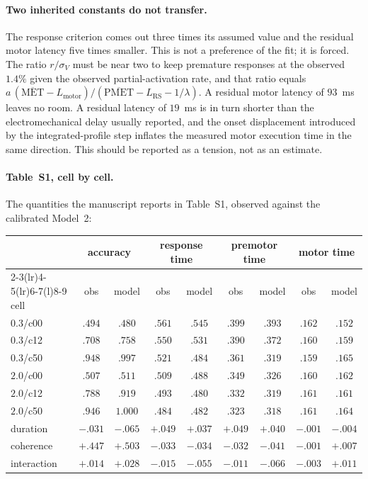 \documentclass[a4paper,11pt]{article}
\newcommand{\NN}[1]{\textcolor{newcol}{#1}}
\newcommand{\1}{\mathbbm{1}}
\newcommand{\Lrs}{L_{\mathrm{RS}}}
\newcommand{\Lmo}{L_{\mathrm{motor}}}
\begin{document}
\paragraph{Two inherited constants do not transfer.} The response criterion comes out
three times its assumed value and the residual motor latency five times smaller. This
is not a preference of the fit; it is forced. The ratio $r/\sigma_V$ must be near two to
keep premature responses at the observed $1.4\%$ given the observed partial-activation
rate, and that ratio equals $a\,(\overline{\mathrm{MET}}-\Lmo)/
(\overline{\mathrm{PMET}}-\Lrs-1/\lambda)$. A residual motor latency of $93$~ms leaves
no room. \NN{A residual latency of $19$~ms is in turn shorter than the electromechanical
delay usually reported, and the onset displacement introduced by the integrated-profile
step inflates the measured motor execution time in the same direction. This should be
reported as a tension, not as an estimate.}

\paragraph{Table~S1, cell by cell.} The quantities the manuscript reports in Table~S1,
observed against the calibrated Model~2:

\begin{center}\small
\begin{tabular}{lcccccccc}
\toprule
& \multicolumn{2}{c}{accuracy} & \multicolumn{2}{c}{response time}
& \multicolumn{2}{c}{premotor time} & \multicolumn{2}{c}{motor time}\\
\cmidrule(lr){2-3}\cmidrule(lr){4-5}\cmidrule(lr){6-7}\cmidrule(l){8-9}
cell & obs & model & obs & model & obs & model & obs & model\\
\midrule
$0.3$/c00 & $.494$ & $.480$ & $.561$ & $.545$ & $.399$ & $.393$ & $.162$ & $.152$\\
$0.3$/c12 & $.708$ & $.758$ & $.550$ & $.531$ & $.390$ & $.372$ & $.160$ & $.159$\\
$0.3$/c50 & $.948$ & $.997$ & $.521$ & $.484$ & $.361$ & $.319$ & $.159$ & $.165$\\
$2.0$/c00 & $.507$ & $.511$ & $.509$ & $.488$ & $.349$ & $.326$ & $.160$ & $.162$\\
$2.0$/c12 & $.788$ & $.919$ & $.493$ & $.480$ & $.332$ & $.319$ & $.161$ & $.161$\\
$2.0$/c50 & $.946$ & $1.000$ & $.484$ & $.482$ & $.323$ & $.318$ & $.161$ & $.164$\\
\midrule
duration & $-.031$ & $-.065$ & $+.049$ & $+.037$ & $+.049$ & $+.040$ & $-.001$ & $-.004$\\
coherence & $+.447$ & $+.503$ & $-.033$ & $-.034$ & $-.032$ & $-.041$ & $-.001$ & $+.007$\\
interaction & $+.014$ & $+.028$ & $-.015$ & $-.055$ & $-.011$ & $-.066$ & $-.003$ & $+.011$\\
\bottomrule
\end{tabular}
\end{center}
\end{document}
